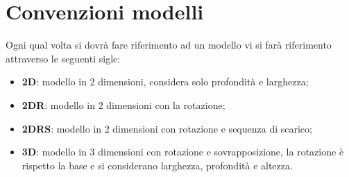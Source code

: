 \section{Convenzioni modelli}
Ogni qual volta si dovrà fare riferimento ad un modello vi si farà riferimento attraverso le seguenti sigle:
\begin{itemize}
	\item \textbf{2D}: modello in 2 dimensioni, considera solo profondità e larghezza;
	\item \textbf{2DR}: modello in 2 dimensioni con la rotazione;
	\item \textbf{2DRS}: modello in 2 dimensioni con rotazione e sequenza di scarico;
	\item \textbf{3D}: modello in 3 dimensioni con rotazione e sovrapposizione, la rotazione è rispetto la base e si considerano larghezza, profondità e altezza.
\end{itemize}